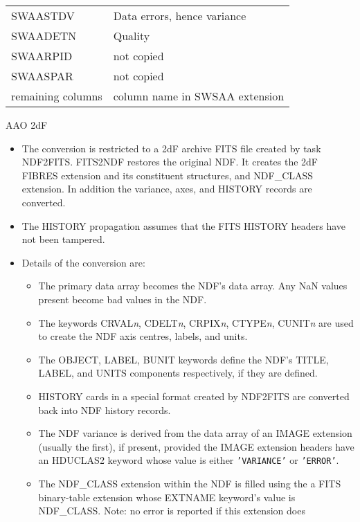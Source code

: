 \documentclass[twoside,11pt]{article}
\newcommand{\htmladdnormallink}[2]{#1}
\newcommand{\xref}[3]{#1}
\newcommand{\ssthitemlist}[1]{
  \latexonly{
  \mbox{} \\
  \vspace{-3.5ex}
  }
  \begin{itemize}
     #1
  \end{itemize}
}
\newcommand{\sstitem}{\item}
\newcommand{\sstitem}{\item}
\begin{document}
{{{{\begin{tabular}{ll}
               SWAASTDV           &   Data errors, hence variance \\
               SWAADETN           &   Quality \\
               SWAARPID           &   not copied \\
               SWAASPAR           &   not copied \\
               remaining columns  &   column name in SWSAA extension \\
            \end{tabular}
         }
         \bigskip
         \sstitem
         AAO \htmladdnormallink{2dF}{http://www.aao.gov.au/local/www/2df/}
         \ssthitemlist{
            \sstitem
            The conversion is restricted to a 2dF archive FITS file
            created by task NDF2FITS.  FITS2NDF restores the original NDF.
            It creates the 2dF FIBRES extension and its constituent
            structures, and NDF\_CLASS extension.  In addition the variance,
            axes, and HISTORY records are converted.
            \sstitem
            The HISTORY propagation assumes that the FITS HISTORY headers
            have not been tampered.
            \sstitem
            Details of the conversion are:
            \ssthitemlist{
               \sstitem
               The primary data array becomes the NDF's data array.  Any
               NaN values present become \xref{bad}{sun95}{se_badmasking} values in the NDF.
               \sstitem
               The keywords CRVAL\textit{n}, CDELT\textit{n}, CRPIX\textit{n},
               CTYPE\textit{n}, CUNIT\textit{n} are
               used to create the NDF axis centres, labels, and units.
               \sstitem
               The OBJECT, LABEL, BUNIT keywords define the NDF's TITLE,
               LABEL, and UNITS components respectively, if they are defined.
               \sstitem
               HISTORY cards in a special format created by NDF2FITS are
               converted back into NDF history records.
               \sstitem
               The NDF variance is derived from the data array of an
               IMAGE extension (usually the first), if present, provided the
               IMAGE extension headers have an HDUCLAS2 keyword whose value
               is either \texttt{'VARIANCE'} or \texttt{'ERROR'}.
               \sstitem
               The NDF\_CLASS extension within the NDF is filled using the
               a FITS binary-table extension whose EXTNAME keyword's value is
               NDF\_CLASS.  Note: no error is reported if this extension does
}}}}}
\end{document}
